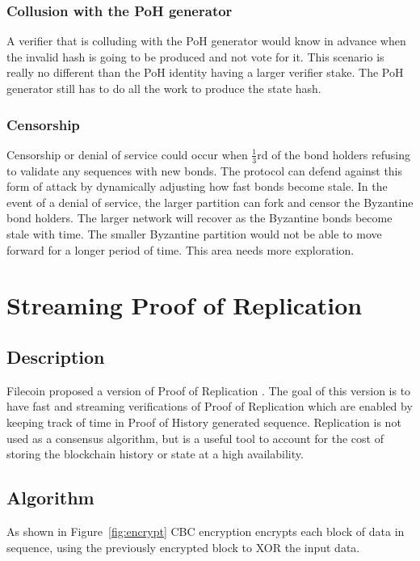 \documentclass[12pt]{article}
\begin{document}
\subsubsection{Collusion with the PoH generator}\label{subsubsec:collusion}
A verifier that is colluding with the PoH generator would know in advance when the invalid hash is going to be produced and not vote for it.  This scenario is really no different than the PoH identity having a larger verifier stake.  The PoH generator still has to do all the work to produce the state hash.
\subsubsection{Censorship}\label{subsubsec:censorship}
Censorship or denial of service could occur when \(\frac{1}{3}\)rd of the bond holders refusing to validate any sequences with new bonds. The protocol can defend against this form of attack by dynamically adjusting how fast bonds become stale.  In the event of a denial of service, the larger partition can fork and censor the Byzantine bond holders.  The larger network will recover as the Byzantine bonds become stale with time. The smaller Byzantine partition would not be able to move forward for a longer period of time. This area needs more exploration.

\section{Streaming Proof of Replication}\label{porep}
\subsection{Description}
Filecoin proposed a version of Proof of Replication \cite{filecoinporep}.  The goal of this version is to have fast and streaming verifications of Proof of Replication which are enabled by keeping track of time in Proof of History generated sequence.  Replication is not used as a consensus algorithm, but is a useful tool to account for the cost of storing the blockchain history or state at a high availability.
\subsection{Algorithm}
As shown in Figure~\ref{fig:encrypt} CBC encryption encrypts each block of data in sequence, using the previously encrypted block to XOR the input data.
\end{document}
